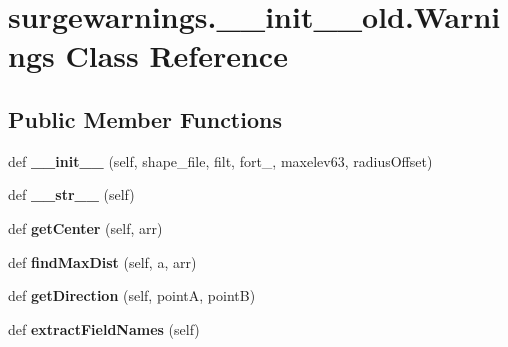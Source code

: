 \hypertarget{classsurgewarnings_1_1____init____old_1_1_warnings}{}\section{surgewarnings.\+\_\+\+\_\+init\+\_\+\+\_\+old.\+Warnings Class Reference}
\label{classsurgewarnings_1_1____init____old_1_1_warnings}
\subsection*{Public Member Functions}
\begin{DoxyCompactItemize}
\item 
\hypertarget{classsurgewarnings_1_1____init____old_1_1_warnings_a864393383da701280802b8d8f7a30644}{}def {\bfseries \+\_\+\+\_\+init\+\_\+\+\_\+} (self, shape\+\_\+file, filt, fort\+\_, maxelev63, radius\+Offset)\label{classsurgewarnings_1_1____init____old_1_1_warnings_a864393383da701280802b8d8f7a30644}

\item 
\hypertarget{classsurgewarnings_1_1____init____old_1_1_warnings_af7d370789634777cf949411ae65ca329}{}def {\bfseries \+\_\+\+\_\+str\+\_\+\+\_\+} (self)\label{classsurgewarnings_1_1____init____old_1_1_warnings_af7d370789634777cf949411ae65ca329}

\item 
\hypertarget{classsurgewarnings_1_1____init____old_1_1_warnings_aaccee21e779ae3b1c9f3dcfb3f31726a}{}def {\bfseries get\+Center} (self, arr)\label{classsurgewarnings_1_1____init____old_1_1_warnings_aaccee21e779ae3b1c9f3dcfb3f31726a}

\item 
\hypertarget{classsurgewarnings_1_1____init____old_1_1_warnings_a842f27fa503f8ec5df65f82f5ca6353c}{}def {\bfseries find\+Max\+Dist} (self, a, arr)\label{classsurgewarnings_1_1____init____old_1_1_warnings_a842f27fa503f8ec5df65f82f5ca6353c}

\item 
\hypertarget{classsurgewarnings_1_1____init____old_1_1_warnings_ad8debb4e9ff9d675c1bcd256a50f8ce4}{}def {\bfseries get\+Direction} (self, point\+A, point\+B)\label{classsurgewarnings_1_1____init____old_1_1_warnings_ad8debb4e9ff9d675c1bcd256a50f8ce4}

\item 
\hypertarget{classsurgewarnings_1_1____init____old_1_1_warnings_af8864887597450310a4205aa2a29a7f2}{}def {\bfseries extract\+Field\+Names} (self)\label{classsurgewarnings_1_1____init____old_1_1_warnings_af8864887597450310a4205aa2a29a7f2}


\end{DoxyCompactItemize}
